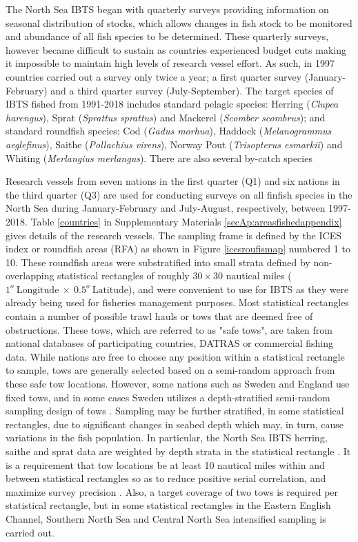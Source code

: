\documentclass[a4paper 12pt]{article}
\numberwithin{equation}{section}
\begin{document}
\indent The North Sea IBTS began with quarterly surveys providing information on seasonal distribution of stocks, which allows changes in fish stock to be monitored and abundance of all fish species to be determined. These quarterly surveys, however became difficult to sustain as countries experienced budget cuts making it impossible to maintain high levels of research vessel effort. As such, in 1997 countries carried out a survey only twice a year; a first quarter survey (January-February) and a third quarter survey (July-September). The target species of IBTS fished from 1991-2018 includes standard pelagic species: Herring (\textit{Clupea harengus}), Sprat (\textit{Sprattus sprattus}) and Mackerel (\textit{Scomber scombrus}); and standard roundfish species: Cod (\textit{Gadus morhua}), Haddock (\textit{Melanogrammus aeglefinus}), Saithe (\textit{Pollachius virens}),  Norway Pout (\textit{Trisopterus esmarkii})  and Whiting (\textit{Merlangius merlangus}). There are also several by-catch species \citep{ICES2006Report}

Research vessels from seven nations in the first quarter (Q1) and six nations in the third quarter (Q3) are used for conducting surveys on all finfish species in the North Sea during January-February and July-August, respectively, between 1997-2018. Table \ref{countries} in Supplementary Materials \ref{secAp:areasfishedappendix} gives details of the research vessels. The sampling frame is defined by the ICES index or roundfish areas (RFA) as shown in Figure \ref{icesroufismap} numbered 1 to 10. These  roundfish areas were substratified into small strata defined by non-overlapping statistical rectangles of roughly $30 \times 30$ nautical miles ($1^{o} \  \mathrm{Longitude} \ \times  \  0.5^{o} \ \mathrm{Latitude}$), and were convenient to use for IBTS as they were already being used for fisheries management purposes. Most statistical rectangles contain a number of possible trawl hauls or tows that are deemed free of obstructions. These tows, which are referred to as   "safe tows", are taken from national databases of participating countries, DATRAS \citep{datras} or commercial fishing data. While nations are free to choose any position within a statistical rectangle to sample, tows are generally selected based on a semi-random approach from these safe tow locations. However, some nations such as Sweden and England use fixed tows, and in some cases Sweden utilizes a depth-stratified semi-random sampling design of tows \citep{ICES2018}. Sampling may be further stratified, in some statistical rectangles, due to significant changes in seabed depth which may, in turn, cause variations in the fish population. In particular, the North Sea IBTS herring, saithe and sprat data are weighted by depth strata in the statistical rectangle \citep{ICES2013}. It is a requirement that tow locations be at least 10 nautical miles within and between statistical rectangles so as to reduce positive serial correlation, and maximize survey precision \citep{ICES2018}. Also, a target coverage of two tows is required per statistical rectangle\citep{ICES2015}, but in some statistical rectangles in the Eastern English Channel, Southern North Sea and Central North Sea intensified sampling is carried out.
\end{document}
